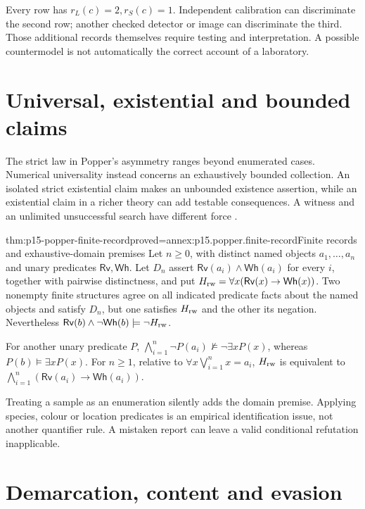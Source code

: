 Every row has \(r_L(c)=2,r_S(c)=1\).
Independent calibration can discriminate the second row;
another checked detector or image can discriminate the third.
Those additional records themselves require testing and interpretation.
A possible countermodel is not automatically the correct account
of a laboratory.

\section{Universal, existential and bounded claims}
\label{sec:p15-popper-asymmetry}

The strict law in Popper's asymmetry ranges beyond enumerated cases.
Numerical universality instead concerns an exhaustively bounded
collection. An isolated strict existential claim makes an unbounded
existence assertion, while an existential claim in a richer theory
can add testable consequences. A witness and an unlimited unsuccessful
search have different force \parencite[\S\S13--15, including
the starred qualification]{Popper2002LogicDiscoveryUI}.

\begin{hbtheorem}{thm:p15-popper-finite-record}{proved=annex:p15.popper.finite-record}{Finite records and exhaustive-domain premises}
Let \(n\geq0\), with distinct named objects \(a_1,\ldots,a_n\)
and unary predicates \(\mathsf{Rv},\mathsf{Wh}\).
Let \(D_n\) assert \(\mathsf{Rv}(a_i)\land\mathsf{Wh}(a_i)\)
for every \(i\), together with pairwise distinctness, and put
\(H_{\rm rw}=\forall x(\mathsf{Rv}(x)\to\mathsf{Wh}(x))\).
Two nonempty finite structures agree on all indicated predicate
facts about the named objects and satisfy \(D_n\), but one satisfies
\(H_{\rm rw}\) and the other its negation.
Nevertheless
\(\mathsf{Rv}(b)\land\neg\mathsf{Wh}(b)\models\neg H_{\rm rw}\).

For another unary predicate \(P\),
\(\bigwedge_{i=1}^n\neg P(a_i)\not\models\neg\exists xP(x)\),
whereas \(P(b)\models\exists xP(x)\).
For \(n\geq1\), relative to
\(\forall x\bigvee_{i=1}^n x=a_i\), \(H_{\rm rw}\) is equivalent to
\(\bigwedge_{i=1}^n(\mathsf{Rv}(a_i)\to\mathsf{Wh}(a_i))\).
\end{hbtheorem}

Treating a sample as an enumeration silently adds the domain premise.
Applying species, colour or location predicates is an empirical
identification issue, not another quantifier rule. A mistaken report
can leave a valid conditional refutation inapplicable.

\section{Demarcation, content and evasion}
\label{sec:p15-popper-falsifiers}

